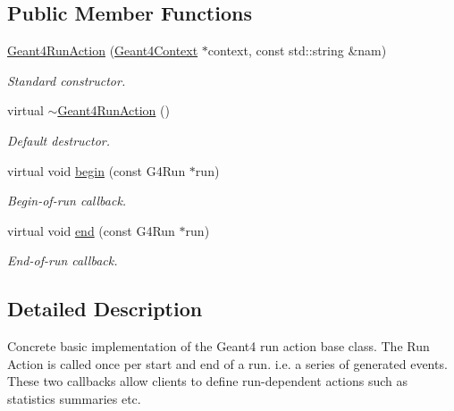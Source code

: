 \subsection*{Public Member Functions}
\begin{DoxyCompactItemize}
\item 
\hyperlink{class_d_d4hep_1_1_simulation_1_1_geant4_run_action_acba7cd27cdc34c98d799848c4bc5ccf6}{Geant4RunAction} (\hyperlink{class_d_d4hep_1_1_simulation_1_1_geant4_context}{Geant4Context} $\ast$context, const std::string \&nam)
\begin{DoxyCompactList}\small\item\em Standard constructor. \item\end{DoxyCompactList}\item 
virtual \hyperlink{class_d_d4hep_1_1_simulation_1_1_geant4_run_action_ac4db0a811956b595cfba64e2a210e290}{$\sim$Geant4RunAction} ()
\begin{DoxyCompactList}\small\item\em Default destructor. \item\end{DoxyCompactList}\item 
virtual void \hyperlink{class_d_d4hep_1_1_simulation_1_1_geant4_run_action_aeea4684e5d27e039b26734c3dbf3f65b}{begin} (const G4Run $\ast$run)
\begin{DoxyCompactList}\small\item\em Begin-\/of-\/run callback. \item\end{DoxyCompactList}\item 
virtual void \hyperlink{class_d_d4hep_1_1_simulation_1_1_geant4_run_action_a71c7dbfb3451a9d6cc594f0174a631a2}{end} (const G4Run $\ast$run)
\begin{DoxyCompactList}\small\item\em End-\/of-\/run callback. \item\end{DoxyCompactList}\end{DoxyCompactItemize}


\subsection{Detailed Description}
Concrete basic implementation of the Geant4 run action base class. The Run Action is called once per start and end of a run. i.e. a series of generated events. These two callbacks allow clients to define run-\/dependent actions such as statistics summaries etc.

